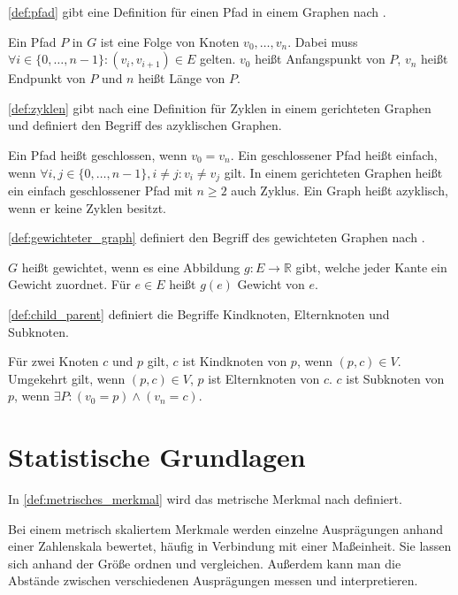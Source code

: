 \autoref{def:pfad} gibt eine Definition für einen Pfad in einem Graphen nach
\autocite[Vgl.][S.221f]{AlgorithmenUndDatenstrukturen}.
\begin{definition}
    Ein Pfad $P$ in $G$  ist eine Folge von Knoten $v_0, \dots ,v_n$. Dabei
    muss $\forall i \in \{0, \dots, n-1 \} : (v_i,v_{i+1}) \in E$ gelten. $v_0$
    heißt Anfangspunkt von $P$, $v_n$ heißt Endpunkt von $P$ und $n$ heißt
    Länge von $P$.
    \label{def:pfad}
\end{definition}

\autoref{def:zyklen} gibt nach
\autocite[Vgl.][S.222]{AlgorithmenUndDatenstrukturen} eine Definition für
Zyklen in einem gerichteten Graphen und definiert den Begriff des azyklischen
Graphen.
\begin{definition}
    Ein Pfad heißt geschlossen, wenn $v_0 = v_n$. Ein
    geschlossener Pfad heißt einfach, wenn $\forall i,j \in \{0,\dots,n-1\}, i
    \ne j:v_i \ne v_j$ gilt. In einem gerichteten Graphen heißt ein einfach
    geschlossener Pfad mit $n\geq 2$ auch Zyklus. Ein Graph heißt azyklisch,
    wenn er keine Zyklen besitzt.
    \label{def:zyklen}
\end{definition}

\autoref{def:gewichteter_graph} definiert den Begriff des gewichteten Graphen
nach \autocite[Vgl.][S.253]{AlgorithmenUndDatenstrukturen}.
\begin{definition}
    $G$ heißt gewichtet, wenn es eine Abbildung $g:E\rightarrow \mathbb{R}$
    gibt, welche jeder Kante ein Gewicht zuordnet. Für $e\in E$ heißt $g(e)$
    Gewicht von $e$.
    \label{def:gewichteter_graph}
\end{definition}

\autoref{def:child_parent} definiert die Begriffe Kindknoten, Elternknoten und
Subknoten.
\begin{definition}
    Für zwei Knoten $c$ und $p$ gilt, $c$ ist Kindknoten von $p$, wenn $(p,c)\in V$.
    Umgekehrt gilt, wenn $(p,c)\in V$, $p$ ist Elternknoten von $c$.
    $c$ ist Subknoten von $p$, wenn $\exists P: (v_0=p) \land (v_n=c)$.
    \label{def:child_parent}
\end{definition}

\section{Statistische Grundlagen}
\label{sec:statistische_grundlagen}
In \autoref{def:metrisches_merkmal} wird das metrische Merkmal nach
\autocite[Vgl.][S.24]{Statistik} definiert.
\begin{definition}
    Bei einem metrisch skaliertem Merkmale werden einzelne Ausprägungen anhand
    einer Zahlenskala bewertet, häufig in Verbindung mit einer Maßeinheit. Sie
    lassen sich anhand der Größe ordnen und vergleichen. Außerdem kann man die
    Abstände zwischen verschiedenen Ausprägungen messen und interpretieren.
    \label{def:metrisches_merkmal}
\end{definition}

